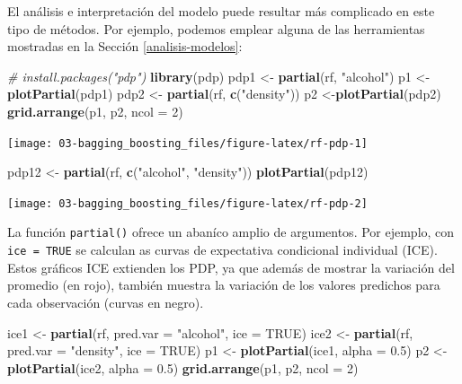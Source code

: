 \documentclass[
  spanish,
]{book}
\newenvironment{Shaded}{\begin{snugshade}}{\end{snugshade}}
\newcommand{\CommentTok}[1]{\textcolor[rgb]{0.56,0.35,0.01}{\textit{#1}}}
\newcommand{\DataTypeTok}[1]{\textcolor[rgb]{0.13,0.29,0.53}{#1}}
\newcommand{\DecValTok}[1]{\textcolor[rgb]{0.00,0.00,0.81}{#1}}
\newcommand{\FloatTok}[1]{\textcolor[rgb]{0.00,0.00,0.81}{#1}}
\newcommand{\KeywordTok}[1]{\textcolor[rgb]{0.13,0.29,0.53}{\textbf{#1}}}
\newcommand{\NormalTok}[1]{#1}
\newcommand{\OtherTok}[1]{\textcolor[rgb]{0.56,0.35,0.01}{#1}}
\newcommand{\StringTok}[1]{\textcolor[rgb]{0.31,0.60,0.02}{#1}}
\theoremstyle{break}
\theoremstyle{definition}
\theoremstyle{definition}
\theoremstyle{definition}
\theoremstyle{remark}
\begin{document}
El análisis e interpretación del modelo puede resultar más complicado en este tipo de métodos.
Por ejemplo, podemos emplear alguna de las herramientas mostradas en la Sección \ref{analisis-modelos}:

\begin{Shaded}
\begin{Highlighting}[]
\CommentTok{# install.packages("pdp")}
\KeywordTok{library}\NormalTok{(pdp)}
\NormalTok{pdp1 <-}\StringTok{ }\KeywordTok{partial}\NormalTok{(rf, }\StringTok{"alcohol"}\NormalTok{)}
\NormalTok{p1 <-}\StringTok{ }\KeywordTok{plotPartial}\NormalTok{(pdp1)}
\NormalTok{pdp2 <-}\StringTok{ }\KeywordTok{partial}\NormalTok{(rf, }\KeywordTok{c}\NormalTok{(}\StringTok{"density"}\NormalTok{))}
\NormalTok{p2 <-}\KeywordTok{plotPartial}\NormalTok{(pdp2)}
\KeywordTok{grid.arrange}\NormalTok{(p1, p2, }\DataTypeTok{ncol =} \DecValTok{2}\NormalTok{)}
\end{Highlighting}
\end{Shaded}

\begin{center}\texttt{[image: 03-bagging\_boosting\_files/figure-latex/rf-pdp-1]} \end{center}

\begin{Shaded}
\begin{Highlighting}[]
\NormalTok{pdp12 <-}\StringTok{ }\KeywordTok{partial}\NormalTok{(rf, }\KeywordTok{c}\NormalTok{(}\StringTok{"alcohol"}\NormalTok{, }\StringTok{"density"}\NormalTok{))}
\KeywordTok{plotPartial}\NormalTok{(pdp12)}
\end{Highlighting}
\end{Shaded}

\begin{center}\texttt{[image: 03-bagging\_boosting\_files/figure-latex/rf-pdp-2]} \end{center}

La función \texttt{partial()} ofrece un abaníco amplio de argumentos. Por ejemplo, con \texttt{ice\ =\ TRUE} se calculan as curvas de expectativa condicional individual (ICE). Estos gráficos ICE extienden los PDP, ya que además de mostrar la variación del promedio (en rojo), también muestra la variación de los valores predichos para cada observación (curvas en negro).

\begin{Shaded}
\begin{Highlighting}[]
\NormalTok{ice1 <-}\StringTok{ }\KeywordTok{partial}\NormalTok{(rf, }\DataTypeTok{pred.var =} \StringTok{"alcohol"}\NormalTok{, }\DataTypeTok{ice =} \OtherTok{TRUE}\NormalTok{)}
\NormalTok{ice2 <-}\StringTok{ }\KeywordTok{partial}\NormalTok{(rf, }\DataTypeTok{pred.var =} \StringTok{"density"}\NormalTok{, }\DataTypeTok{ice =} \OtherTok{TRUE}\NormalTok{)}
\NormalTok{p1 <-}\StringTok{ }\KeywordTok{plotPartial}\NormalTok{(ice1, }\DataTypeTok{alpha =} \FloatTok{0.5}\NormalTok{)}
\NormalTok{p2 <-}\StringTok{ }\KeywordTok{plotPartial}\NormalTok{(ice2, }\DataTypeTok{alpha =} \FloatTok{0.5}\NormalTok{)}
\KeywordTok{grid.arrange}\NormalTok{(p1, p2, }\DataTypeTok{ncol =} \DecValTok{2}\NormalTok{)}
\end{Highlighting}
\end{Shaded}
\end{document}
